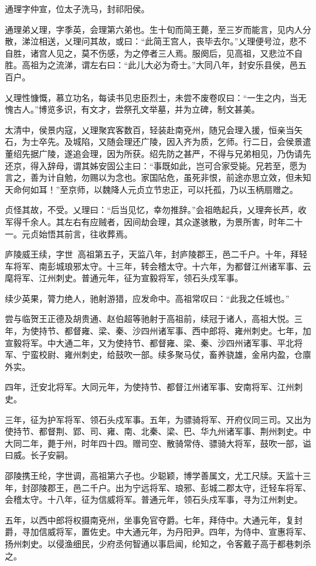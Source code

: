 \documentclass[12pt,UTF8]{ctexbook}
\begin{document}
通理字仲宣，位太子洗马，封祁阳侯。

通理弟乂理，字季英，会理第六弟也。生十旬而简王薨，至三岁而能言，见内人分散，涕泣相送，乂理问其故，或曰：“此简王宫人，丧毕去尔。”乂理便号泣，悲不自胜，诸宫人见之，莫不伤感，为之停者三人焉。服阕后，见高祖，又悲泣不自胜。高祖为之流涕，谓左右曰：“此儿大必为奇士。”大同八年，封安乐县侯，邑五百户。

乂理性慷慨，慕立功名，每读书见忠臣烈士，未尝不废卷叹曰：“一生之内，当无愧古人。”博览多识，有文才，尝祭孔文举墓，并为立碑，制文甚美。

太清中，侯景内寇，乂理聚宾客数百，轻装赴南兗州，随兄会理入援，恒亲当矢石，为士卒先。及城陷，又随会理还广陵，因入齐为质，乞师。行二日，会侯景遣董绍先据广陵，遂追会理，因为所获。绍先防之甚严，不得与兄弟相见，乃伪请先还京，得入辞母，谓其姊安固公主曰：“事既如此，岂可合家受毙。兄若至，愿为言之，善为计自勉，勿赐以为念也。家国阽危，虽死非恨，前途亦思立效，但未知天命何如耳！”至京师，以魏降人元贞立节忠正，可以托孤，乃以玉柄扇赠之。

贞怪其故，不受。乂理曰：“后当见忆，幸勿推辞。”会祖皓起兵，乂理奔长芦，收军得千余人。其左右有应贼者，因间劫会理，其众遂骇散，为景所害，时年二十一。元贞始悟其前言，往收葬焉。

庐陵威王续，字世，高祖第五子，天监八年，封庐陵郡王，邑二千户。十年，拜轻车将军、南彭城琅邪太守。十三年，转会稽太守。十六年，为都督江州诸军事、云麾将军、江州刺史。普通元年，征为宣毅将军，领石头戍军事。

续少英果，膂力绝人，驰射游猎，应发命中。高祖常叹曰：“此我之任城也。”

尝与临贺王正德及胡贵通、赵伯超等驰射于高祖前，续冠于诸人，高祖大悦。三年，为使持节、都督雍、梁、秦、沙四州诸军事、西中郎将、雍州刺史。七年，加宣毅将军。中大通二年，又为使持节、都督雍、梁、秦、沙四州诸军事、平北将军、宁蛮校尉、雍州刺史，给鼓吹一部。续多聚马仗，畜养骁雄，金帛内盈，仓廪外实。

四年，迁安北将军。大同元年，为使持节、都督江州诸军事、安南将军、江州刺史。

三年，征为护军将军、领石头戍军事。五年，为骠骑将军、开府仪同三司。又出为使持节、都督荆、郢、司、雍、南、北秦、梁、巴、华九州诸军事、荆州刺史。中大同二年，薨于州，时年四十四。赠司空、散骑常侍、骠骑大将军，鼓吹一部，谥曰威。长子安嗣。

邵陵携王纶，字世调，高祖第六子也。少聪颖，博学善属文，尤工尺牍。天监十三年，封邵陵郡王，邑二千户。出为宁远将军、琅邪、彭城二郡太守，迁轻车将军、会稽太守。十八年，征为信威将军。普通元年，领石头戍军事，寻为江州刺史。

五年，以西中郎将权摄南兗州，坐事免官夺爵。七年，拜侍中。大通元年，复封爵，寻加信威将军，置佐史。中大通元年，为丹阳尹。四年，为侍中、宣惠将军、扬州刺史。以侵渔细民，少府丞何智通以事启闻，纶知之，令客戴子高于都巷刺杀之。
\end{document}

